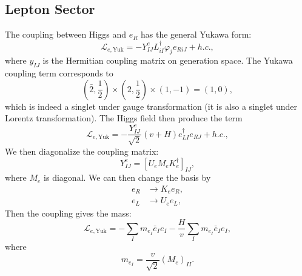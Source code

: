 \documentclass[aps,prb,superscriptaddress,nofootinbib]{revtex4}
\begin{document}
\subsection{Lepton Sector}
The coupling between Higgs and $e_R$ has the general Yukawa form:
\begin{equation}
	\mathcal L_{e,\mathrm{Yuk}} = -Y^e_{IJ} L_{iI}^\dagger \varphi_j e_{R iJ} + h.c.,
\end{equation}
where $y_{IJ}$ is the Hermitian coupling matrix on generation space.
The Yukawa coupling term corresponds to
\begin{equation}
	\left(\bar 2, \frac{1}{2}\right) \times \left(2, \frac{1}{2}\right) \times \left(1, -1\right) = \left(1,0\right),
\end{equation}
which is indeed a singlet under gauge transformation (it is also a singlet under Lorentz transformation).
The Higgs field then produce the term
\begin{equation}
	\mathcal L_{e,\mathrm{Yuk}} = -\frac{Y^e_{IJ}}{\sqrt 2}(v+H) e_{LI}^\dagger e_{RJ} + h.c.,
\end{equation}
We then diagonalize the coupling matrix:
\begin{equation}
	 Y^e_{IJ} = \left[U_{e} M_e K^\dagger_{e}\right]_{IJ},
\end{equation}
where $M_e$ is diagonal.
We can then change the basis by
\begin{equation}
\begin{aligned}
	e_R &\rightarrow K_e e_R, \\
	e_L &\rightarrow U_e e_L,
\end{aligned}
\end{equation}
Then the coupling gives the mass:
\begin{equation}
	\mathcal L_{e,\mathrm{Yuk}} 
	= - \sum_I m_{e_I} \bar e_I e_I - \frac{H}{v}\sum_I m_{e_I} \bar e_I e_I,
\end{equation}
where
\begin{equation}
	m_{e_I} = \frac{v}{\sqrt 2} (M_e)_{II}.
\end{equation}
\end{document}
